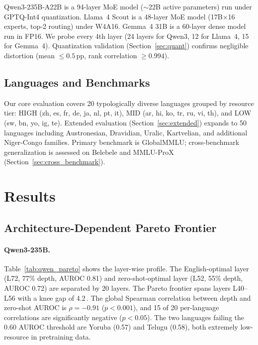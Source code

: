 \documentclass[11pt,a4paper]{article}
\newcommand{\pp}{\,\text{pp}}
\begin{document}
Qwen3-235B-A22B is a 94-layer MoE model ($\sim$22B active parameters) run under GPTQ-Int4 quantization. Llama~4 Scout is a 48-layer MoE model (17B$\times$16 experts, top-2 routing) under W4A16. Gemma~4 31B is a 60-layer dense model run in FP16. We probe every 4th layer (24 layers for Qwen3, 12 for Llama~4, 15 for Gemma~4). Quantization validation (Section~\ref{sec:quant}) confirms negligible distortion (mean $\leq 0.5\pp$, rank correlation $\geq 0.994$).

\subsection{Languages and Benchmarks}

Our core evaluation covers 20 typologically diverse languages grouped by resource tier: HIGH (zh, es, fr, de, ja, nl, pt, it), MID (ar, hi, ko, tr, ru, vi, th), and LOW (sw, bn, yo, ig, te). Extended evaluation (Section~\ref{sec:extended}) expands to 50 languages including Austronesian, Dravidian, Uralic, Kartvelian, and additional Niger-Congo families. Primary benchmark is GlobalMMLU; cross-benchmark generalization is assessed on Belebele and MMLU-ProX (Section~\ref{sec:cross_benchmark}).

\section{Results}
\label{sec:results}

\subsection{Architecture-Dependent Pareto Frontier}
\label{sec:pareto}

\paragraph{Qwen3-235B.}
Table~\ref{tab:qwen_pareto} shows the layer-wise profile. The English-optimal layer (L72, 77\% depth, AUROC 0.81) and zero-shot-optimal layer (L52, 55\% depth, AUROC 0.72) are separated by 20 layers. The Pareto frontier spans layers L40--L56 with a knee gap of 4.2\pp. The global Spearman correlation between depth and zero-shot AUROC is $\rho = -0.91$ ($p < 0.001$), and 15 of 20 per-language correlations are significantly negative ($p < 0.05$). The two languages failing the 0.60 AUROC threshold are Yoruba (0.57) and Telugu (0.58), both extremely low-resource in pretraining data.
\end{document}
